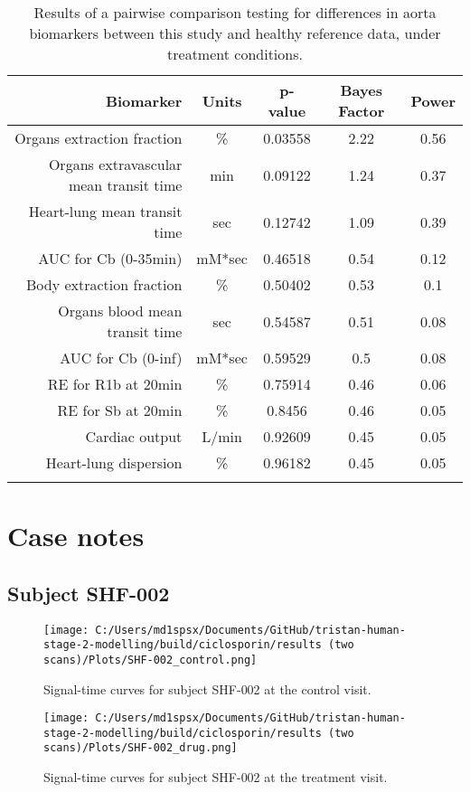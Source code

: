 \documentclass{epflreport}%
\begin{document}
\begin{longtable}{rcccc}%
\hline%
Biomarker&Units&p{-}value&Bayes Factor&Power\\%
\hline%
Organs extraction fraction&\%&0.03558&2.22&0.56\\%
Organs extravascular mean transit time&min&0.09122&1.24&0.37\\%
Heart{-}lung mean transit time&sec&0.12742&1.09&0.39\\%
AUC for Cb (0{-}35min)&mM*sec&0.46518&0.54&0.12\\%
Body extraction fraction&\%&0.50402&0.53&0.1\\%
Organs blood mean transit time&sec&0.54587&0.51&0.08\\%
AUC for Cb (0{-}inf)&mM*sec&0.59529&0.5&0.08\\%
RE for R1b at 20min&\%&0.75914&0.46&0.06\\%
RE for Sb at 20min&\%&0.8456&0.46&0.05\\%
Cardiac output&L/min&0.92609&0.45&0.05\\%
Heart{-}lung dispersion&\%&0.96182&0.45&0.05\\%
\hline%
\caption{Results of a pairwise comparison testing for differences in aorta biomarkers between this study and healthy reference data, under treatment conditions.} \\%
\end{longtable}%
\clearpage%
\section{Case notes}%
\label{sec:Casenotes}%

%
\subsection{Subject SHF{-}002}%
\label{subsec:SubjectSHF{-}002}%

%


\begin{figure}[h!]%
\centering%
\texttt{[image: C:/Users/md1spsx/Documents/GitHub/tristan-human-stage-2-modelling/build/ciclosporin/results (two scans)/Plots/SHF-002\_control.png]}%
\caption{Signal{-}time curves for subject SHF{-}002 at the control visit.}%
\end{figure}

%


\begin{figure}[h!]%
\centering%
\texttt{[image: C:/Users/md1spsx/Documents/GitHub/tristan-human-stage-2-modelling/build/ciclosporin/results (two scans)/Plots/SHF-002\_drug.png]}%
\caption{Signal{-}time curves for subject SHF{-}002 at the treatment visit.}%
\end{figure}
\end{document}
